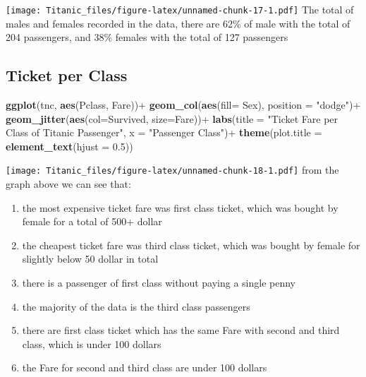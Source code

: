\documentclass[
]{article}
\newenvironment{Shaded}{\begin{snugshade}}{\end{snugshade}}
\newcommand{\AttributeTok}[1]{\textcolor[rgb]{0.74,0.68,0.62}{#1}}
\newcommand{\FloatTok}[1]{\textcolor[rgb]{0.27,0.67,0.26}{#1}}
\newcommand{\FunctionTok}[1]{\textcolor[rgb]{1.00,0.58,0.35}{\textbf{#1}}}
\newcommand{\NormalTok}[1]{\textcolor[rgb]{0.74,0.68,0.62}{#1}}
\newcommand{\SpecialCharTok}[1]{\textcolor[rgb]{0.02,0.61,0.04}{#1}}
\newcommand{\StringTok}[1]{\textcolor[rgb]{0.02,0.61,0.04}{#1}}
\begin{document}
\texttt{[image: Titanic\_files/figure-latex/unnamed-chunk-17-1.pdf]} The
total of males and females recorded in the data, there are 62\% of male
with the total of 204 passengers, and 38\% females with the total of 127
passengers

\hypertarget{ticket-per-class}{%
\subsection{Ticket per Class}\label{ticket-per-class}}

\begin{Shaded}
\begin{Highlighting}[]
\FunctionTok{ggplot}\NormalTok{(tnc, }\FunctionTok{aes}\NormalTok{(Pclass, Fare))}\SpecialCharTok{+}
  \FunctionTok{geom\_col}\NormalTok{(}\FunctionTok{aes}\NormalTok{(}\AttributeTok{fill=}\NormalTok{ Sex), }\AttributeTok{position =} \StringTok{"dodge"}\NormalTok{)}\SpecialCharTok{+}
  \FunctionTok{geom\_jitter}\NormalTok{(}\FunctionTok{aes}\NormalTok{(}\AttributeTok{col=}\NormalTok{Survived, }\AttributeTok{size=}\NormalTok{Fare))}\SpecialCharTok{+}
  \FunctionTok{labs}\NormalTok{(}\AttributeTok{title =} \StringTok{"Ticket Fare per Class of Titanic Passenger"}\NormalTok{, }
       \AttributeTok{x =} \StringTok{"Passenger Class"}\NormalTok{)}\SpecialCharTok{+}
  \FunctionTok{theme}\NormalTok{(}\AttributeTok{plot.title =} \FunctionTok{element\_text}\NormalTok{(}\AttributeTok{hjust =} \FloatTok{0.5}\NormalTok{))}
\end{Highlighting}
\end{Shaded}

\texttt{[image: Titanic\_files/figure-latex/unnamed-chunk-18-1.pdf]} from
the graph above we can see that:

\begin{enumerate}
\def\labelenumi{\arabic{enumi}.}
\item
  the most expensive ticket fare was first class ticket, which was
  bought by female for a total of 500+ dollar
\item
  the cheapest ticket fare was third class ticket, which was bought by
  female for slightly below 50 dollar in total
\item
  there is a passenger of first class without paying a single penny
\item
  the majority of the data is the third class passengers
\item
  there are first class ticket which has the same Fare with second and
  third class, which is under 100 dollars
\item
  the Fare for second and third class are under 100 dollars
\end{enumerate}
\end{document}
